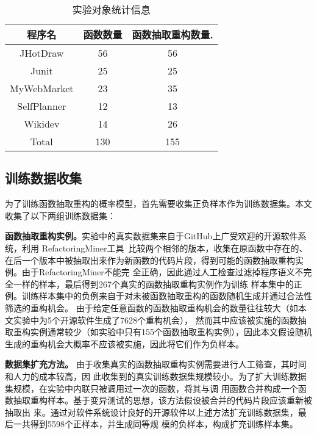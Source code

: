 \begin{table}[!t]
\zihaowu
  \renewcommand{\arraystretch}{1.3}
  \caption{实验对象统计信息}
  \label{benchmark}
  \centering
  \begin{tabular}{ccc}
  \toprule 
  程序名 &函数数量 &函数抽取重构数量.\\ \midrule
  JHotDraw &56 &56 \\ 
  Junit &25 &25 \\ 
  MyWebMarket &23 &35 \\ 
  SelfPlanner &12 &13 \\ 
  Wikidev &14 &26 \\ \midrule
  Total &130 &155 \\ 
  \bottomrule
  \end{tabular}
  \end{table}

\subsection{训练数据收集}
为了训练函数抽取重构的概率模型，首先需要收集正负样本作为训练数据集。本文收集了以下两组训练数据集：

\textbf{函数抽取重构实例。}实验中的真实数据集来自于GitHub上广受欢迎的开源软件系统，利用
RefactoringMiner工具~\cite{tsantalis2013multidimensional}比较两个相邻的版本，收集在原函数中存在的、
在后一个版本中被抽取出来作为新函数的代码片段，得到可能的函数抽取重构实例。由于RefactoringMiner不能完
全正确，因此通过人工检查过滤掉程序语义不完全一样的样本，最后得到267个真实的函数抽取重构实例作为训练
样本集中的正例。训练样本集中的负例来自于对未被函数抽取重构的函数随机生成并通过合法性筛选的重构机会。
由于给定任意函数的函数抽取重构机会的数量往往较大（如本文实验中为5个开源软件生成了7628个重构机会），
然而其中应该被实施的函数抽取重构实例通常较少（如实验中只有155个函数抽取重构实例），因此本文假设随机
生成的重构机会大概率不应该被实施，因此将它们作为负样本。

\textbf{数据集扩充方法。} 由于收集真实的函数抽取重构实例需要进行人工筛查，其时间和人力的成本较高，因
此收集到的真实训练数据集规模较小。为了扩大训练数据集规模，在实验中内联只被调用过一次的函数，将其与调
用函数合并构成一个函数抽取重构样本。基于变异测试的思想，该方法假设被合并的代码片段应该重新被抽取出
来。通过对软件系统设计良好的开源软件以上述方法扩充训练数据集，最后一共得到5598个正样本，并生成同等规
模的负样本，构成扩充训练样本集。
  
